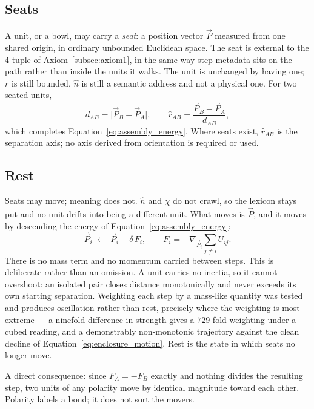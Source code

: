 \documentclass[12pt, a4paper]{article}
\begin{document}
\subsection{Seats}
\label{subsec:enclosure_seats}
A unit, or a bowl, may carry a \emph{seat}: a position vector
$\vec P$ measured from one shared origin, in ordinary unbounded
Euclidean space. The seat is external to the 4-tuple of
Axiom~\ref{subsec:axiom1}, in the same way step metadata sits on the
path rather than inside the units it walks. The unit is unchanged by
having one; $r$ is still bounded, $\hat n$ is still a semantic
address and not a physical one. For two seated units,
\begin{equation}
    d_{AB} = \lvert \vec P_B - \vec P_A\rvert,
    \qquad
    \hat r_{AB} = \frac{\vec P_B - \vec P_A}{d_{AB}},
    \label{eq:enclosure_distance}
\end{equation}
which completes Equation~\eqref{eq:assembly_energy}. Where seats
exist, $\hat r_{AB}$ is the separation axis; no axis derived from
orientation is required or used.

\subsection{Rest}
\label{subsec:enclosure_rest}
Seats may move; meaning does not. $\hat n$ and $\chi$ do not crawl,
so the lexicon stays put and no unit drifts into being a different
unit. What moves is $\vec P$, and it moves by descending the energy
of Equation~\eqref{eq:assembly_energy}:
\begin{equation}
    \vec P_i \;\leftarrow\; \vec P_i + \delta\,F_i,
    \qquad
    F_i = -\nabla_{\vec P_i}\!\!\sum_{j\ne i} U_{ij}.
    \label{eq:enclosure_motion}
\end{equation}
There is no mass term and no momentum carried between steps. This
is deliberate rather than an omission. A unit carries no inertia, so
it cannot overshoot: an isolated pair closes distance monotonically
and never exceeds its own starting separation. Weighting each step
by a mass-like quantity was tested and produces oscillation rather
than rest, precisely where the weighting is most extreme --- a
ninefold difference in strength gives a $729$-fold weighting under a
cubed reading, and a demonstrably non-monotonic trajectory against
the clean decline of Equation~\eqref{eq:enclosure_motion}. Rest is
the state in which seats no longer move.

A direct consequence: since $F_A=-F_B$ exactly and nothing divides
the resulting step, two units of any polarity move by identical
magnitude toward each other. Polarity labels a bond; it does not
sort the movers.
\end{document}
